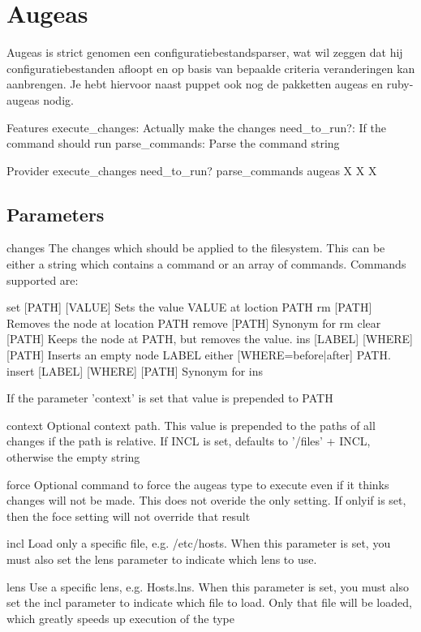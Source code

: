 \section{Augeas}
Augeas is strict genomen een configuratiebestandsparser, wat wil zeggen dat hij configuratiebestanden afloopt en op basis van bepaalde criteria veranderingen kan aanbrengen. Je hebt hiervoor naast puppet ook nog de pakketten augeas en ruby-augeas nodig.

Features
    execute\_changes: Actually make the changes
    need\_to\_run?: If the command should run
    parse\_commands: Parse the command string

Provider 	execute\_changes 	need\_to\_run? 	parse\_commands
augeas		X 			X 		X

\subsection{Parameters}
changes
The changes which should be applied to the filesystem. This can be either a string which contains a command or an array of commands. Commands supported are:

set [PATH] [VALUE]            Sets the value VALUE at loction PATH
rm [PATH]                     Removes the node at location PATH
remove [PATH]                 Synonym for rm
clear [PATH]                  Keeps the node at PATH, but removes the value.
ins [LABEL] [WHERE] [PATH]    Inserts an empty node LABEL either [WHERE={before|after}] PATH.
insert [LABEL] [WHERE] [PATH] Synonym for ins

If the parameter 'context' is set that value is prepended to PATH

context
Optional context path. This value is prepended to the paths of all changes if the path is relative. If INCL is set, defaults to '/files' + INCL, otherwise the empty string

force
Optional command to force the augeas type to execute even if it thinks changes will not be made. This does not overide the only setting. If onlyif is set, then the foce setting will not override that result

incl
Load only a specific file, e.g. /etc/hosts. When this parameter is set, you must also set the lens parameter to indicate which lens to use.

lens
Use a specific lens, e.g. Hosts.lns. When this parameter is set, you must also set the incl parameter to indicate which file to load. Only that file will be loaded, which greatly speeds up execution of the type

